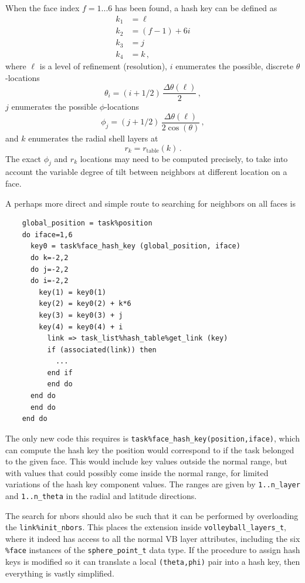 \documentclass[paper=a4,fontsize=11pt]{scrartcl}
\numberwithin{equation}{section}		%
\numberwithin{figure}{section}			%
\numberwithin{table}{section}				%
\newcommand{\codecolor}{\color{Blue}}
\newcommand{\Code}[1]{{\codecolor\texttt{#1}}}
\begin{document}
When the face index $f=1...6$ has been found, a hash key can be defined as
\begin{align}
  k_1 &= \ell \\
  k_2 &= (f-1) + 6 i \\
  k_3 &= j \\
  k_4 &= k \,,
\end{align}
where $\ell$ is a level of refinement (resolution), $i$ enumerates the possible, discrete $\theta$-locations
\begin{equation}
    \theta_i = (i+1/2)\,\frac{\Delta\theta(\ell)}{2} \,,
\end{equation}
$j$ enumerates the possible $\phi$-locations
\begin{equation}
    \phi_j = (j+1/2)\,\frac{\Delta\theta(\ell)}{2\cos(\theta)} \,,
\end{equation}
and $k$ enumerates the radial shell layers at
\begin{equation}
    r_k = r_\mathrm{table}(k) \,.
\end{equation}
The exact $\phi_j$ and $r_k$ locations may need to be computed precisely, to take into account the variable degree of tilt between neighbors at different location on a face.

A perhaps more direct and simple route to searching for neighbors on all faces is
{\codecolor\small\begin{verbatim}
    global_position = task%position
    do iface=1,6
      key0 = task%face_hash_key (global_position, iface)
      do k=-2,2
      do j=-2,2
      do i=-2,2
        key(1) = key0(1)
        key(2) = key0(2) + k*6
        key(3) = key0(3) + j
        key(4) = key0(4) + i
          link => task_list%hash_table%get_link (key)
          if (associated(link)) then
            ...
          end if
          end do
      end do
      end do
    end do
\end{verbatim}}
The only new code this requires is \Code{task\%face\_hash\_key(position,iface)}, which can compute the hash key the position would correspond to if the task belonged to the given face.  This would include key values outside the normal range, but with values that could possibly come inside the normal range, for limited variations of the hash key component values.  The ranges are given by \Code{1..n\_layer} and \Code{1..n\_theta} in the radial and latitude directions.

The search for nbors should also be such that it can be performed by overloading the \Code{link\%init\_nbors}.  This places the extension inside \Code{volleyball\_layers\_t}, where it indeed has access to all the normal VB layer attributes, including the six \Code{\%face} instances of the \Code{sphere\_point\_t} data type.  If the procedure to assign hash keys is modified so it can translate a local \Code{(theta,phi)} pair into a hash key, then everything is vastly simplified.
\end{document}
